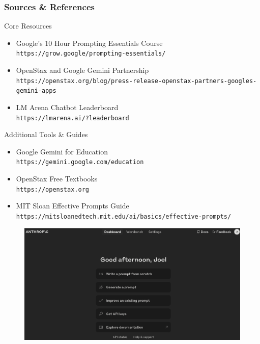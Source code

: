\documentclass{beamer}
\begin{document}
\begin{frame}[allowframebreaks]
\frametitle{Sources \& References}

\begin{block}{Core Resources}
\begin{itemize}
\item Google's 10 Hour Prompting Essentials Course\\
    \texttt{https://grow.google/prompting-essentials/}
\item OpenStax and Google Gemini Partnership\\
    \texttt{https://openstax.org/blog/press-release-openstax-partners-googles-gemini-apps}
\item LM Arena Chatbot Leaderboard\\
    \texttt{https://lmarena.ai/?leaderboard}
\end{itemize}
\end{block}

\begin{block}{Additional Tools \& Guides}
\begin{itemize}
\item Google Gemini for Education\\
    \texttt{https://gemini.google.com/education}
\item OpenStax Free Textbooks\\
    \texttt{https://openstax.org}
\item MIT Sloan Effective Prompts Guide\\
    \texttt{https://mitsloanedtech.mit.edu/ai/basics/effective-prompts/}
\end{itemize}
\end{block}
\end{frame}

\begin{frame}
\begin{figure}
    \centering
    \includegraphics[width=1\linewidth]{../images/cs12-prompt-anthropic_console.png}
\end{figure}
\end{frame}
\end{document}
